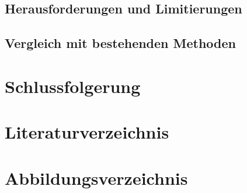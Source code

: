 \documentclass[a4paper,12pt,twoside]{article}
\begin{document}
\subsection{Herausforderungen und Limitierungen}
\subsection{Vergleich mit bestehenden Methoden}

\section{Schlussfolgerung}
\section{Literaturverzeichnis}
\section{Abbildungsverzeichnis}
\end{document}
